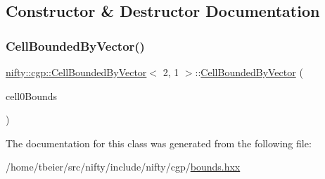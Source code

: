\subsection{Constructor \& Destructor Documentation}
\mbox{\label{classnifty_1_1cgp_1_1CellBoundedByVector_3_012_00_011_01_4_a234e9640290d247f90261787b95fcc90}} 
\subsubsection{\texorpdfstring{Cell\+Bounded\+By\+Vector()}{CellBoundedByVector()}}
{\footnotesize\ttfamily \hyperlink{classnifty_1_1cgp_1_1CellBoundedByVector}{nifty\+::cgp\+::\+Cell\+Bounded\+By\+Vector}$<$ 2, 1 $>$\+::\hyperlink{classnifty_1_1cgp_1_1CellBoundedByVector}{Cell\+Bounded\+By\+Vector} (\begin{DoxyParamCaption}\item[{const \hyperlink{classnifty_1_1cgp_1_1CellBoundsVector}{Cell\+Bounds\+Vector}$<$ 2, 0 $>$ \&}]{cell0\+Bounds }\end{DoxyParamCaption})\hspace{0.3cm}{\ttfamily [inline]}}



The documentation for this class was generated from the following file\+:\begin{DoxyCompactItemize}
\item 
/home/tbeier/src/nifty/include/nifty/cgp/\hyperlink{bounds_8hxx}{bounds.\+hxx}\end{DoxyCompactItemize}
